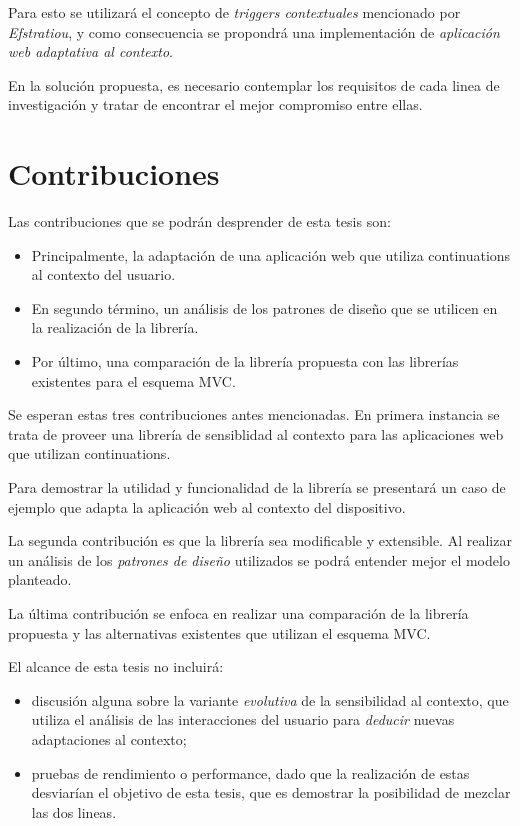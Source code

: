 Para esto se utilizará el concepto de \emph{triggers contextuales} mencionado por \emph{Efstratiou}, y como consecuencia se propondrá una implementación de \emph{aplicación web adaptativa al contexto}.

En la solución propuesta, es necesario contemplar los requisitos de cada linea de investigación y tratar de encontrar el mejor compromiso entre ellas.


\section{Contribuciones}

Las contribuciones que se podrán desprender de esta tesis son:
\begin{itemize}
\item Principalmente, la adaptación de una aplicación web que utiliza continuations al contexto del usuario.
\item En segundo término, un análisis de los patrones de diseño que se utilicen en la realización de la librería.
\item Por último, una comparación de la librería propuesta con las librerías existentes para el esquema MVC.
\end{itemize}

Se esperan estas tres contribuciones antes mencionadas. En primera instancia se trata de proveer una librería de sensiblidad al contexto para las aplicaciones web que utilizan continuations.

Para demostrar la utilidad y funcionalidad de la librería se presentará un caso de ejemplo que adapta la aplicación web al contexto del dispositivo.

La segunda contribución es que la librería sea modificable y extensible. Al realizar un análisis de los \emph{patrones de diseño}\cite{Gamma95} utilizados se podrá entender mejor el modelo planteado.

La última contribución se enfoca en realizar una comparación de la librería propuesta y las alternativas existentes que utilizan el esquema MVC.

El alcance de esta tesis no incluirá:
\begin{itemize}
\item discusión alguna sobre la variante \emph{evolutiva} de la sensibilidad al contexto, que utiliza el análisis de las interacciones del usuario para \emph{deducir} nuevas adaptaciones al contexto;
\item pruebas de rendimiento o performance, dado que la realización de estas desviarían el objetivo de esta tesis, que es demostrar la posibilidad de mezclar las dos lineas.
\end{itemize}


